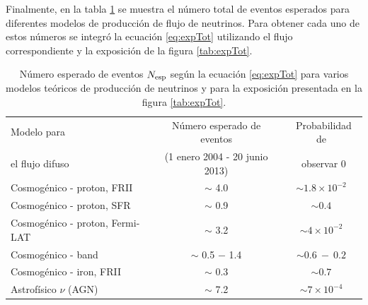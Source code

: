  	Finalmente, en la tabla \ref{tab:rates} se muestra el n\'umero total de eventos esperados para diferentes modelos de producci\'on de flujo de neutrinos.
 	Para obtener cada uno de estos n\'umeros se integr\'o la ecuaci\'on \ref{eq:expTot} utilizando el flujo correspondiente y la exposici\'on de la figura \ref{tab:expTot}.
	\begin{table}[!t]
	\begin{center}
	\renewcommand{\arraystretch}{1.3}
	\scriptsize
	\begin{tabular}{l c c} 
	\hline
	Modelo para       &  Número esperado de eventos     & ~Probabilidad de   \\
	el flujo difuso   &  (1 enero 2004 - 20 junio 2013) & ~observar $0$   \\
	\hline
	Cosmogénico - proton, FRII \cite{Kampert_GZK}     &  $\sim$ 4.0  & $\sim 1.8\times 10^{-2}$ \\

	Cosmogénico - proton, SFR \cite{Kampert_GZK}      &  $\sim$ 0.9  & $\sim 0.4$               \\

	Cosmogénico - proton, Fermi-LAT \cite{Ahlers_GZK} &  $\sim$ 3.2  & $\sim 4\times 10^{-2}$   \\

	Cosmogénico - band \cite{Kotera_GZK}              &  $\sim$ 0.5 $-$ 1.4 & $\sim 0.6~-~0.2$ \\

	Cosmogénico - iron, FRII \cite{Kampert_GZK}       &  $\sim$ 0.3  & $\sim 0.7$ \\

	\hline

	Astrofísico $\nu$ (AGN) \cite{Becker_AGN}     &  $\sim$ 7.2  & $\sim 7\times 10^{-4}$ \\

% 

	\hline
	\end{tabular}
	\end{center}
	\vskip -3mm
	\caption{\label{tab:rates}
	Número esperado de eventos $N_{\rm esp}$ según la ecuación \ref{eq:expTot} para varios modelos teóricos de producción de neutrinos y para la exposición presentada en la figura \ref{tab:expTot}.
	}
	\end{table}
	
